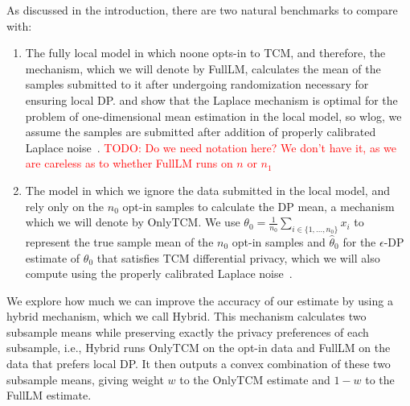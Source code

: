 \documentclass{article}
\newcommand\TODO[1]{\textcolor{red}{TODO: {#1}}}
\theoremstyle{plain}
\begin{document}
As discussed in the introduction, there are two natural benchmarks to compare with:
\begin{enumerate}
\item The fully local model in which noone opts-in to TCM, and therefore, the mechanism, which we will denote by FullLM, calculates the mean of the samples submitted to it after undergoing randomization necessary for ensuring local DP. \cite{duchi} and \cite{dky18} show that the Laplace mechanism is optimal for the problem of one-dimensional mean estimation in the local model, so wlog, we assume the samples are submitted after addition of properly calibrated Laplace noise~\cite{dmns06}. \TODO{Do we need notation here? We don't have it, as we are careless as to whether FullLM runs on $n$ or $n_1$}
\item The model in which we ignore the data submitted in the local model, and rely only on the $n_0$ opt-in samples to calculate the DP mean, a mechanism which we will denote by OnlyTCM. We use $\theta_0 = \frac{1}{n_0}\sum_{i \in \{1, \dots, n_0\}} x_i$ to represent the true sample mean of the $n_0$ opt-in samples and $\hat{\theta}_0$ for the $\epsilon$-DP estimate of $\theta_0$ that satisfies TCM differential privacy, which we will also compute using the properly calibrated Laplace noise~\cite{dmns06}.
\end{enumerate}  


We explore how much we can improve the accuracy of our estimate by using a hybrid mechanism, which we call Hybrid. This mechanism calculates two subsample means while preserving exactly the privacy preferences of each subsample, i.e., Hybrid runs OnlyTCM on the opt-in data and FullLM on the data that prefers local DP. It then outputs a convex combination of these two subsample means, giving weight $w$ to the OnlyTCM estimate and $1-w$ to the FullLM estimate. 
\end{document}
